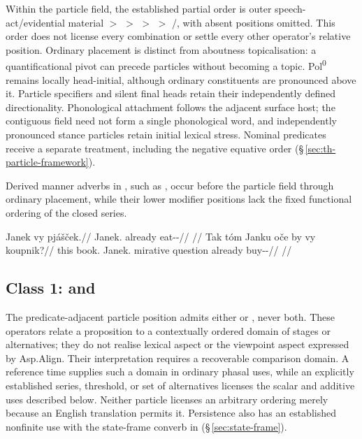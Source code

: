 \noindent Within the particle field, the established partial order is
outer speech-act/evidential material $>$  $>$  $>$
 $>$ /, with absent positions omitted.
This order does not license every combination or settle every other operator's
relative position. Ordinary placement is distinct from aboutness topicalisation:
a quantificational pivot can precede particles without becoming a topic.
Pol\textsuperscript{0} remains locally head-initial, although ordinary
constituents are pronounced above it. Particle specifiers and silent final
heads retain their independently defined directionality. Phonological
attachment follows the adjacent surface host; the contiguous field need not
form a single phonological word, and independently pronounced stance particles
retain initial lexical stress. Nominal predicates receive a separate treatment,
including the negative equative order 
(§\,\ref{sec:th-particle-framework}).

Derived manner adverbs in , such as  ,
occur before the particle field through ordinary placement, while their lower
modifier positions lack the fixed functional ordering of the closed series.

\pex
\a
\begingl
\gla Janek vy pjášček.//
\glb Janek.\Dir{} already eat-\Antip{}-\Pf{}//
\glft {}//
\endgl
\a
\begingl
\gla Tak tóm Janku oče by vy koupnik?//
\glb this book.\Dir{} Janek.\Trs{} mirative question already buy-\Trs{}-\Pf{}//
\glft {}//
\endgl
\xe

\subsection{Class 1:  and }\label{sec:class1-particles}

The predicate-adjacent particle position admits either  or ,
never both. These operators relate a proposition to a contextually ordered
domain of stages or alternatives; they do not realise lexical aspect or the
viewpoint aspect expressed by Asp.Align. Their interpretation requires a recoverable
comparison domain. A reference time supplies such a domain in ordinary phasal
uses, while an explicitly established series, threshold, or set of alternatives
licenses the scalar and additive uses described below. Neither particle
licenses an arbitrary ordering merely because an English translation permits it.
Persistence also has an established nonfinite use with the state-frame converb
in   (§\,\ref{sec:state-frame}).

